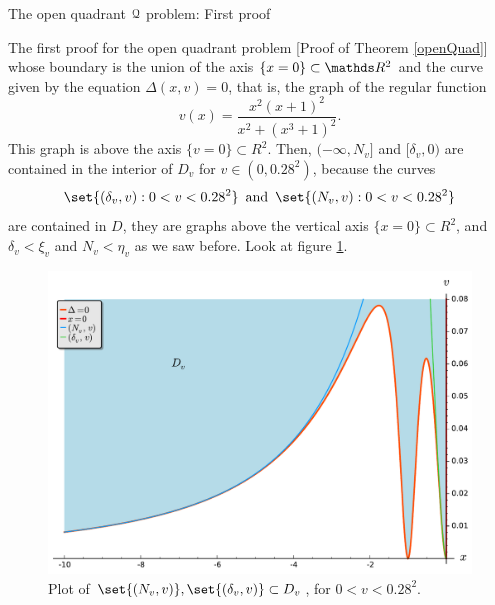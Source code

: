 \documentclass[11pt, a4paper, english, twoside, notitlepage, openright]{report}
\begin{document}
\begin{chapter}{The open quadrant $\mathcal{Q}$ problem: First proof}
\begin{section}{The first proof for the open quadrant problem} [Proof of Theorem \ref{openQuad}]
$$$$ 
whose boundary is the union of the axis $\{x=0\}\subset\R^2$ and the curve given by the equation $\Delta(x,v)=0$, that is, the graph of the regular function
$$
v(x)=\frac{x^2(x+1)^2}{x^2+(x^3+1)^2}.
$$
This graph is above the axis $\{v=0\}\subset R^2$. Then, $(-\infty,N_v]$ and $[\delta_v,0)$ are contained in the interior of $D_v$ for $v\in (0, 0.28^2)$, because the curves 
$$
\set{(\delta_v,v):0<v<0.28^2}\, \, \, \text{and}\, \, \, \set{(N_v,v):0<v<0.28^2}
$$ 
are contained in $D$, they are graphs above the vertical axis $\{x=0\}\subset R^2$, and $\delta_v<\xi_v$ and $N_v<\eta_v$ as we saw before. Look at figure \ref{fig:nice_plot}.

\begin{figure}[h]
\centering
\includegraphics[width=1\textwidth]{plots/ch1_15_nice_plot.pdf}
\caption{Plot of $\set{(N_v,v)}, \set{(\delta_v,v)}\subset D_v$, for $0<v<0.28^2$.\label{fig:nice_plot}}
\end{figure}

\vspace{1mm}


\end{section}
\end{chapter}
\end{document}
